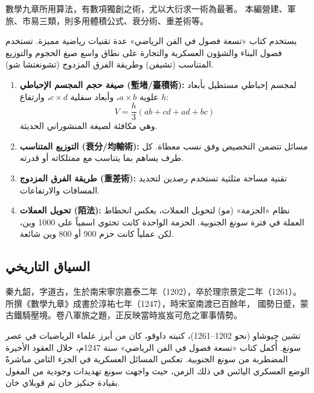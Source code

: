 \documentclass[11pt,a4paper]{article}
\newcommand{\ar}[1]{\arabicfont\beginR #1\endR}
\begin{document}
\noindent
\begin{minipage}[t]{0.48\textwidth}
數學九章所用算法，有數項獨創之術，尤以大衍求一術為最著。
本編營建、軍旅、市易三類，則多用體積公式、衰分術、重差術等。
\end{minipage}
\hfill
\begin{minipage}[t]{0.48\textwidth}
\arabicfont\beginR
يستخدم كتاب «تسعة فصول في الفن الرياضي» عدة تقنيات رياضية مميزة.
تستخدم فصول البناء والشؤون العسكرية والتجارة على نطاق واسع صيغ
الحجوم والتوزيع المتناسب (تشيفن) وطريقة الفرق المزدوج (تشونغتشا شو).
\endR
\end{minipage}

\vspace{0.5em}

\begin{enumerate}
  \item \textbf{\ar{صيغة حجم المجسم الإحباطي} (塹堵/臺積術):} \ar{لمجسم إحباطي مستطيل بأبعاد علوية} $a \times b$\ar{، وأبعاد سفلية} $c \times d$\ar{، وارتفاع} $h$\ar{:}
  \[
  V = \frac{h}{3}(ab + cd + ad + bc)
  \]
  \ar{وهي مكافئة لصيغة المنشوراني الحديثة.}

  \item \textbf{\ar{التوزيع المتناسب} (衰分/均輸術):} \ar{مسائل تتضمن التخصيص وفق نسب معطاة. كل طرف يساهم بما يتناسب مع ممتلكاته أو قدرته.}

  \item \textbf{\ar{طريقة الفرق المزدوج} (重差術):} \ar{تقنية مساحة مثلثية تستخدم رصدين لتحديد المسافات والارتفاعات.}

  \item \textbf{\ar{تحويل العملات} (陌法):} \ar{نظام «الحزمة» (مو) لتحويل العملات، يعكس انحطاط العملة في فترة سونغ الجنوبية. الحزمة الواحدة كانت تحتوي اسمياً على 1000 وين، لكن عملياً كانت حزم 900 أو 800 وين شائعة.}
\end{enumerate}

\subsection*{السياق التاريخي}

\noindent
\begin{minipage}[t]{0.48\textwidth}
秦九韶，字道古，生於南宋寧宗嘉泰二年（1202），卒於理宗景定二年（1261）。
所撰《數學九章》成書於淳祐七年（1247），時宋室南渡已百餘年，
國勢日蹙，蒙古鐵騎壓境。卷八軍旅之題，正反映當時岌岌可危之軍事情勢。
\end{minipage}
\hfill
\begin{minipage}[t]{0.48\textwidth}
\arabicfont\beginR
تشين جيوشاو (نحو 1202--1261)، كنيته داوقو، كان من أبرز علماء
الرياضيات في عصر سونغ. أُكمل كتاب «تسعة فصول في الفن الرياضي»
سنة 1247م، خلال العقود الأخيرة المضطربة من سونغ الجنوبية. تعكس
المسائل العسكرية في الجزء الثامن مباشرةً الوضع العسكري اليائس
في ذلك الزمن، حيث واجهت سونغ تهديدات وجودية من المغول بقيادة
جنكيز خان ثم قوبلاي خان.
\endR
\end{minipage}
\end{document}
